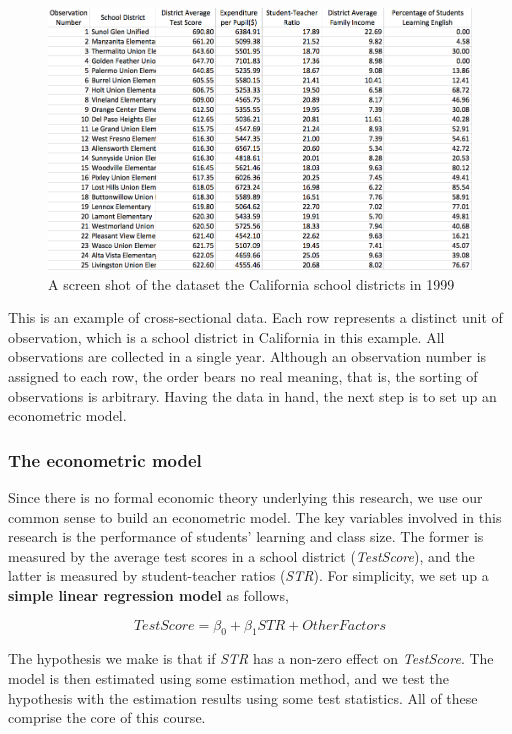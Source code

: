 \documentclass[a4paper,11pt]{article}
\begin{document}
\begin{figure}[htbp]
\centering
\includegraphics[width=1.0\textwidth]{figure/table1_1.png}
\caption{\label{fig:org607a030}
A screen shot of the dataset the California school districts in 1999}
\end{figure}

This is an example of cross-sectional data. Each row represents a
distinct unit of observation, which is a school district in California
in this example. All observations are collected in a single
year. Although an observation number is assigned to each row, the
order bears no real meaning, that is, the sorting of observations is
arbitrary. Having the data in hand, the next step is to set up an
econometric model.

\subsubsection*{The econometric model}
\label{sec:orgfcf86d3}

Since there is no formal economic theory underlying this research, we
use our common sense to build an econometric model. The key variables
involved in this research is the performance of students' learning and
class size. The former is measured by the average test scores in a
school district (\emph{TestScore}), and the latter is measured by student-teacher
ratios (\emph{STR}). For simplicity, we set up a \textbf{simple linear regression
model} as follows,

\[ TestScore = \beta_0 + \beta_1 STR + OtherFactors  \]

The hypothesis we make is that if \emph{STR} has a non-zero effect on
\emph{TestScore}. The model is then estimated using some estimation method,
and we test the hypothesis with the estimation results using some test
statistics. All of these comprise the core of this course.
\end{document}
